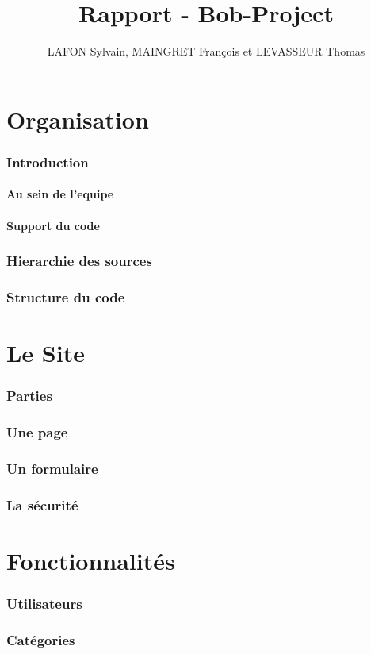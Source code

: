 \documentclass[10pt,a4paper]{article}
\author{LAFON Sylvain, MAINGRET François et LEVASSEUR Thomas}
\title{Rapport - Bob-Project}
\begin{document}
	\maketitle
	\tableofcontents
	\newpage
	\part{Organisation}
		\section{Introduction}
			\subsection{Au sein de l'equipe}
			\subsection{Support du code}
		\section{Hierarchie des sources}
		\section{Structure du code}
	\newpage
	\part{Le Site}
		\section{Parties}
		\section{Une page}
		\section{Un formulaire}
		\section{La sécurité}
	\newpage
	\part{Fonctionnalités}
		\section{Utilisateurs}
		\section{Catégories}
\end{document}
